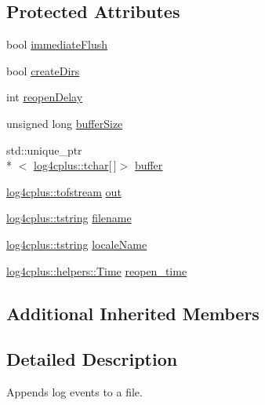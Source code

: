 \subsection*{Protected Attributes}
\begin{DoxyCompactItemize}
\item 
bool \hyperlink{classlog4cplus_1_1FileAppender_a89f7c6ae8f630cc2190a376fcc7ca2cc}{immediate\-Flush}
\item 
bool \hyperlink{classlog4cplus_1_1FileAppender_aa9b466ab8de95868505db1b05c645e3f}{create\-Dirs}
\item 
int \hyperlink{classlog4cplus_1_1FileAppender_a094e4ae84c02d9bcfee5e7837e681e80}{reopen\-Delay}
\item 
unsigned long \hyperlink{classlog4cplus_1_1FileAppender_af22fb2b65a82077a6948ba789b9b12de}{buffer\-Size}
\item 
std\-::unique\-\_\-ptr\\*
$<$ \hyperlink{namespacelog4cplus_a7b80b5711ae9e7a1ddd97dbaefbe3583}{log4cplus\-::tchar}\mbox{[}$\,$\mbox{]}$>$ \hyperlink{classlog4cplus_1_1FileAppender_a420584c8cc879174341da03822d4ed35}{buffer}
\item 
\hyperlink{namespacelog4cplus_a2f9380184debead93aa014e022fca22e}{log4cplus\-::tofstream} \hyperlink{classlog4cplus_1_1FileAppender_a34206d2d34fe3e66e1a8a623c6c22cfe}{out}
\item 
\hyperlink{namespacelog4cplus_a3c9287f6ebcddc50355e29d71152117b}{log4cplus\-::tstring} \hyperlink{classlog4cplus_1_1FileAppender_aa04b4a30301c69d784248eccbac2f864}{filename}
\item 
\hyperlink{namespacelog4cplus_a3c9287f6ebcddc50355e29d71152117b}{log4cplus\-::tstring} \hyperlink{classlog4cplus_1_1FileAppender_a02862bbb42d5dfa02a5121d7bd25d2a0}{locale\-Name}
\item 
\hyperlink{namespacelog4cplus_1_1helpers_af05d40c37e1cccf9d11d0cbb7426bcd4}{log4cplus\-::helpers\-::\-Time} \hyperlink{classlog4cplus_1_1FileAppender_accdc4c309ec3586059ab7431690c0a2b}{reopen\-\_\-time}
\end{DoxyCompactItemize}
\subsection*{Additional Inherited Members}


\subsection{Detailed Description}
Appends log events to a file.

